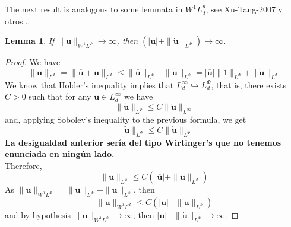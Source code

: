 \documentclass[twoside]{article}
\newtheorem{cor}[thm]{Corollary}
\newtheorem{lem}[thm]{Lemma}
\theoremstyle{remark}
\newtheorem{comentario}{Remark}
\newcommand{\orlnor}{\|_{L^{\Phi}}}
\newcommand{\lphi}{L^{\Phi}}
\newcommand{\wphi}{W^{1}\lphi}
\newcommand{\sobnor}{\|_{W^{1}\lphi}}
\renewcommand{\b}[1]{\boldsymbol{#1}}
\newcommand{\rr}{\mathbb{R}}
\renewcommand{\leq}{\leqslant}
\begin{document}
%
%


The next result is analogous to some lemmata in $W^1L^p_d$, see Xu-Tang-2007 y otros...
\begin{lem}\label{infinito-a-prom-upunto}
If $\|\b{u}\sobnor\to \infty$, then $(|\b{\overline u}|+\|\b{\dot u}\orlnor)\to \infty$.
\end{lem}

\begin{proof}
We have
\[
\|\b{u}\orlnor=
\|\b{\overline u}+\b{\tilde{u}}\orlnor\leq 
\|\b{\overline u}\orlnor+\|\b{\tilde{u}}\orlnor=
|\b{\overline u}|\|1\orlnor+\|\b{\tilde{u}}\orlnor
\]
We know that Holder's inequality implies that $L^{\infty}_d\hookrightarrow\lphi_d$, that is,
there exists $C>0$ such that for any $\b{\tilde{u}}\in L^{\infty}_d$ we have 
\[
\|\b{\tilde{u}}\orlnor
\leq 
C
\|\b{\tilde{u}}\|_{L^{\infty}}
\]
and, applying  Sobolev's inequality to the previous formula,  we get  
\[
\|\b{\tilde{u}}\orlnor
\leq 
C\|\b{\dot{u}}\orlnor
\]
{\bf La desigualdad anterior ser\'ia del tipo Wirtinger's que no tenemos enunciada en ning\'un lado.}
\\
Therefore, 
\begin{equation}
\|\b{u}\orlnor\leq 
C(|\b{\overline u}|+\|\b{\dot{u}}\orlnor)
\end{equation}
As 
$\|\b{u}\sobnor=\|\b{u}\orlnor+\|\b{\dot{u}}\orlnor$, then 
\[
\|\b{u}\sobnor\leq
C(|\b{\overline u}|+\|\b{\dot{u}}\orlnor)
\]
 and by hypothesis $\|\b{u}\sobnor\to \infty$, then 
$|\b{\overline u}|+\|\b{\dot{u}}\orlnor\to \infty$.
\end{proof}
\end{document}
